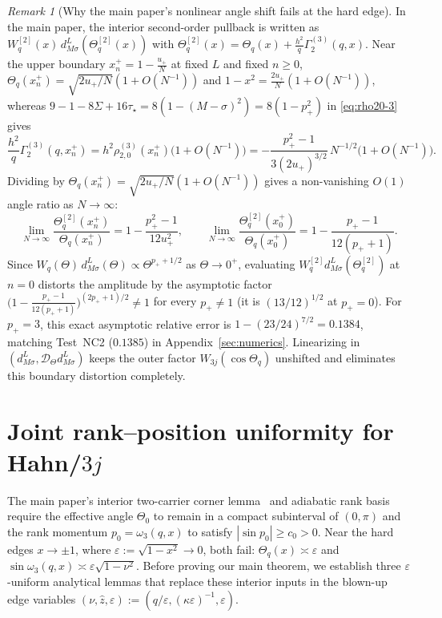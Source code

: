 \documentclass[11pt]{article}
\theoremstyle{definition}
\theoremstyle{remark}
\newtheorem{remark}[theorem]{Remark}
\newcommand{\cD}{\mathcal{D}}
\renewcommand{\_}{\oldunderscore\penalty0\hskip0pt\relax}
\begin{document}
\begin{remark}[Why the main paper's nonlinear angle shift fails at the hard edge]
\label{rem:nonlinear-shift-failure}
In the main paper, the interior second-order pullback is written as $W_q^{[2]}(x)\,d^L_{M\sigma}(\Theta_q^{[2]}(x))$ with
  $\Theta_q^{[2]}(x)=\Theta_q(x)+\frac{h^2}{q}\Gamma_2^{(3)}(q,x)$. Near the upper boundary $x_n^+=1-\frac{u_+}{N}$ at fixed $L$
  and fixed $n\ge 0$, $\Theta_q(x_n^+)=\sqrt{2u_+/N}(1+O(N^{-1}))$ and $1-x^2=\frac{2u_+}{N}(1+O(N^{-1}))$, whereas
  $9-1-8\Sigma+16\tau_\star=8(1-(M-\sigma)^2)=8(1-p_+^2)$ in \eqref{eq:rho20-3} gives
\begin{equation}
  \frac{h^2}{q}\Gamma_2^{(3)}(q,x_n^+) = h^2\rho_{2,0}^{(3)}(x_n^+)\bigl(1+O(N^{-1})\bigr) = -\frac{p_+^2-1}{3(2u_+)^{3/2}}\,N^{-1/2}\bigl(1+O(N^{-1})\bigr).
\end{equation}
Dividing by $\Theta_q(x_n^+)=\sqrt{2u_+/N}(1+O(N^{-1}))$ gives a non-vanishing $O(1)$ angle ratio as $N\to\infty$:
\begin{equation}
  \lim_{N\to\infty}\frac{\Theta_q^{[2]}(x_n^+)}{\Theta_q(x_n^+)} = 1 - \frac{p_+^2-1}{12 u_+^2},
  \qquad
  \lim_{N\to\infty}\frac{\Theta_q^{[2]}(x_0^+)}{\Theta_q(x_0^+)} = 1 - \frac{p_+-1}{12(p_++1)}.
  \label{eq:nonlinear-shift-ratio}
\end{equation}
Since $W_q(\Theta)\,d^L_{M\sigma}(\Theta)\propto\Theta^{p_++1/2}$ as $\Theta\to 0^+$, evaluating
  $W_q^{[2]}d^L_{M\sigma}(\Theta_q^{[2]})$ at $n=0$ distorts the amplitude by the asymptotic factor
  $\bigl(1-\frac{p_+-1}{12(p_++1)}\bigr)^{(2p_++1)/2}\ne 1$ for every $p_+\ne 1$ (it is $(13/12)^{1/2}$ at $p_+=0$). For $p_+=3$, this exact asymptotic relative error
  is $1-(23/24)^{7/2}=0.1384$, matching Test~NC2 ($0.1385$) in Appendix~\ref{sec:numerics}. Linearizing in
  $(d^L_{M\sigma},\cD_\Theta d^L_{M\sigma})$ keeps the outer factor $W_{3j}(\cos\Theta_q)$ unshifted and eliminates this boundary
  distortion completely.
\end{remark}

\section{Joint rank--position uniformity for Hahn/\texorpdfstring{$3j$}{3j}}
\label{sec:main-theorem-3j}

The main paper's interior two-carrier corner lemma~\cite[Lemma~B.3]{LewisGrowingRank} and adiabatic rank basis
  \cite[Lemma~3.11]{LewisGrowingRank} require the effective angle $\Theta_0$ to remain in a compact subinterval of $(0,\pi)$ and the
  rank momentum $p_0=\omega_3(q,x)$ to satisfy $|\sin p_0|\ge c_0>0$. Near the hard edges $x\to\pm 1$, where
  $\varepsilon:=\sqrt{1-x^2}\to 0$, both fail: $\Theta_q(x)\asymp\varepsilon$ and
  $\sin\omega_3(q,x)\asymp\varepsilon\sqrt{1-\nu^2}$. Before proving our main theorem, we establish three $\varepsilon$-uniform
  analytical lemmas that replace these interior inputs in the blown-up edge variables
  $(\nu,\hat{z},\varepsilon):=(q/\varepsilon,(\kappa\varepsilon)^{-1},\varepsilon)$.
\end{document}
